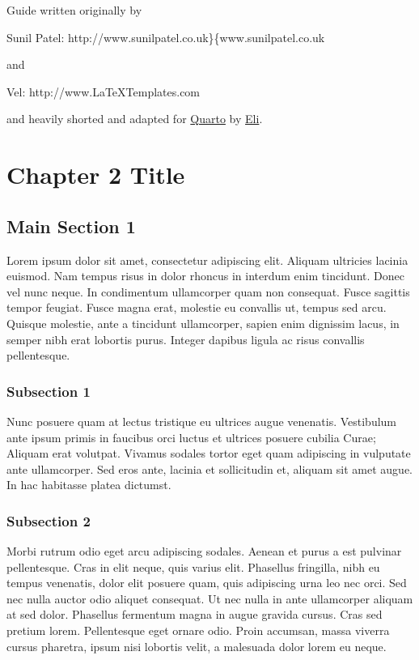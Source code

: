 \documentclass[
  letterpaper,
  12pt,
  oneside,
  spanish,
  doublespacing,
  headsepline,
  parskip]{MastersDoctoralThesis}
\begin{document}
Guide written originally by

Sunil Patel: http://www.sunilpatel.co.uk\}\{www.sunilpatel.co.uk

and

Vel: http://www.LaTeXTemplates.com

and heavily shorted and adapted for \href{https://quarto.org/}{Quarto}
by \href{https://eeholmes.github.io}{Eli}.


\hypertarget{sec-Chapter2}{%
\chapter{Chapter 2 Title}\label{sec-Chapter2}}

\hypertarget{main-section-1}{%
\section{Main Section 1}\label{main-section-1}}

Lorem ipsum dolor sit amet, consectetur adipiscing elit. Aliquam
ultricies lacinia euismod. Nam tempus risus in dolor rhoncus in interdum
enim tincidunt. Donec vel nunc neque. In condimentum ullamcorper quam
non consequat. Fusce sagittis tempor feugiat. Fusce magna erat, molestie
eu convallis ut, tempus sed arcu. Quisque molestie, ante a tincidunt
ullamcorper, sapien enim dignissim lacus, in semper nibh erat lobortis
purus. Integer dapibus ligula ac risus convallis pellentesque.

\hypertarget{subsection-1}{%
\subsection{Subsection 1}\label{subsection-1}}

Nunc posuere quam at lectus tristique eu ultrices augue venenatis.
Vestibulum ante ipsum primis in faucibus orci luctus et ultrices posuere
cubilia Curae; Aliquam erat volutpat. Vivamus sodales tortor eget quam
adipiscing in vulputate ante ullamcorper. Sed eros ante, lacinia et
sollicitudin et, aliquam sit amet augue. In hac habitasse platea
dictumst.

\hypertarget{subsection-2}{%
\subsection{Subsection 2}\label{subsection-2}}

Morbi rutrum odio eget arcu adipiscing sodales. Aenean et purus a est
pulvinar pellentesque. Cras in elit neque, quis varius elit. Phasellus
fringilla, nibh eu tempus venenatis, dolor elit posuere quam, quis
adipiscing urna leo nec orci. Sed nec nulla auctor odio aliquet
consequat. Ut nec nulla in ante ullamcorper aliquam at sed dolor.
Phasellus fermentum magna in augue gravida cursus. Cras sed pretium
lorem. Pellentesque eget ornare odio. Proin accumsan, massa viverra
cursus pharetra, ipsum nisi lobortis velit, a malesuada dolor lorem eu
neque.
\end{document}
